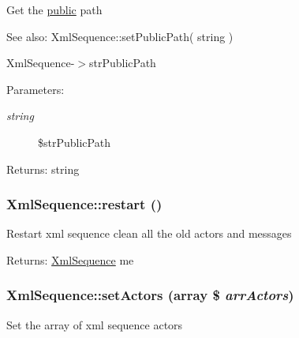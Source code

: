 Get the \hyperlink{namespacepublic}{public} path

\begin{Desc}
\item[See also:]XmlSequence::setPublicPath( string ) 

XmlSequence-$>$strPublicPath \end{Desc}
\begin{Desc}
\item[Parameters:]
\begin{description}
\item[{\em string}]\$strPublicPath \end{description}
\end{Desc}
\begin{Desc}
\item[Returns:]string \end{Desc}
\hypertarget{class_xml_sequence_953da102372c3cd12f7dfe7fb2f01bbd}{
\subsubsection[{restart}]{\setlength{\rightskip}{0pt plus 5cm}XmlSequence::restart ()}}
\label{class_xml_sequence_953da102372c3cd12f7dfe7fb2f01bbd}


Restart xml sequence clean all the old actors and messages

\begin{Desc}
\item[Returns:]\hyperlink{class_xml_sequence}{XmlSequence} me \end{Desc}
\hypertarget{class_xml_sequence_00aa28e395a3d00b7b15b1adebe092db}{
\subsubsection[{setActors}]{\setlength{\rightskip}{0pt plus 5cm}XmlSequence::setActors (array \$ {\em arrActors})}}
\label{class_xml_sequence_00aa28e395a3d00b7b15b1adebe092db}


Set the array of xml sequence actors

